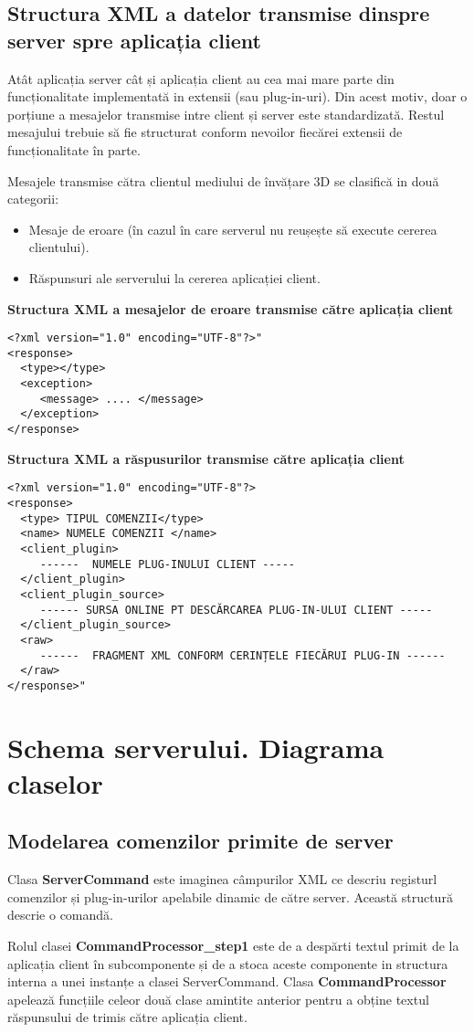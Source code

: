 \subsection{Structura XML a datelor transmise dinspre server spre aplicația client}
\par Atât aplicația server cât și aplicația client au cea mai mare parte din funcționalitate implementată in extensii (sau plug-in-uri). Din acest motiv, doar o porțiune a mesajelor transmise intre client și server este standardizată. Restul mesajului trebuie să fie structurat conform nevoilor fiecărei extensii de funcționalitate în parte.
\par Mesajele transmise cătra clientul mediului de învățare 3D se clasifică in două categorii:
\begin{itemize}
\item Mesaje de eroare (în cazul în care serverul nu reușește să execute cererea clientului).
\item Răspunsuri ale serverului la cererea aplicației client.
\end{itemize}
\textbf{Structura XML a mesajelor de eroare transmise către aplicația client}
\begin{verbatim}
<?xml version="1.0" encoding="UTF-8"?>"
<response>
  <type></type>
  <exception>
     <message> .... </message>
  </exception>
</response>
\end{verbatim}
\textbf{Structura XML a răspusurilor transmise către aplicația client}
\begin{verbatim}
<?xml version="1.0" encoding="UTF-8"?>
<response>
  <type> TIPUL COMENZII</type>
  <name> NUMELE COMENZII </name>  
  <client_plugin> 
     ------  NUMELE PLUG-INULUI CLIENT -----
  </client_plugin>
  <client_plugin_source> 
     ------ SURSA ONLINE PT DESCĂRCAREA PLUG-IN-ULUI CLIENT -----
  </client_plugin_source>
  <raw>
     ------  FRAGMENT XML CONFORM CERINȚELE FIECĂRUI PLUG-IN ------
  </raw>
</response>"
\end{verbatim}

\section{Schema serverului. Diagrama claselor }
\subsection{Modelarea comenzilor primite de server}
\par Clasa \textbf{ServerCommand} este imaginea câmpurilor XML ce descriu registurl comenzilor și plug-in-urilor apelabile dinamic de către server. Această structură descrie o comandă.
\par Rolul clasei \textbf{CommandProcessor\_step1} este de a despărti textul primit de la aplicația client în subcomponente și de a stoca aceste componente in structura interna a unei instanțe a clasei ServerCommand. Clasa \textbf{CommandProcessor} apelează funcțiile celeor două clase amintite anterior pentru a obține textul răspunsului de trimis către aplicația client.

